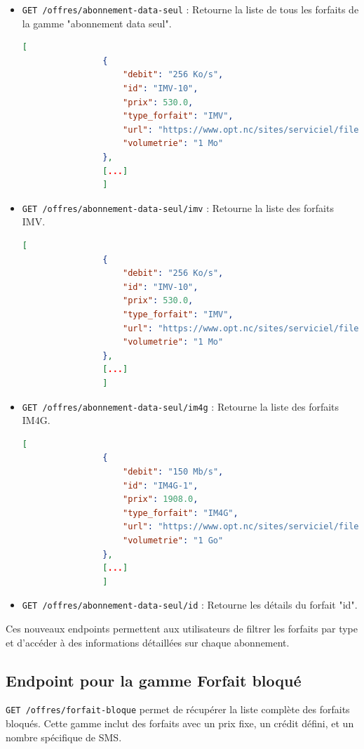 \documentclass[11pt]{article}
\begin{document}
		\begin{itemize}
			\item \texttt{GET /offres/abonnement-data-seul} : Retourne la liste de tous les forfaits de la gamme "abonnement data seul".
			\begin{lstlisting}[language=JSON]
				[
				{
					"debit": "256 Ko/s",
					"id": "IMV-10",
					"prix": 530.0,
					"type_forfait": "IMV",
					"url": "https://www.opt.nc/sites/serviciel/files/media/file/FI_Internet%20Mobile%20au%20Volume.pdf",
					"volumetrie": "1 Mo"
				},
				[...]
				]
			\end{lstlisting}
			
			\item \texttt{GET /offres/abonnement-data-seul/imv} : Retourne la liste des forfaits IMV.
			\begin{lstlisting}[language=JSON]
				[
				{
					"debit": "256 Ko/s",
					"id": "IMV-10",
					"prix": 530.0,
					"type_forfait": "IMV",
					"url": "https://www.opt.nc/sites/serviciel/files/media/file/FI_Internet%20Mobile%20au%20Volume.pdf",
					"volumetrie": "1 Mo"
				},
				[...]
				]
			\end{lstlisting}
			
			\item \texttt{GET /offres/abonnement-data-seul/im4g} : Retourne la liste des forfaits IM4G.
			\begin{lstlisting}[language=JSON]
				[
				{
					"debit": "150 Mb/s",
					"id": "IM4G-1",
					"prix": 1908.0,
					"type_forfait": "IM4G",
					"url": "https://www.opt.nc/sites/serviciel/files/media/file/FI_ForfaitInternetMobile4G%202022_1.pdf",
					"volumetrie": "1 Go"
				},
				[...]
				]
			\end{lstlisting}
			
			\item \texttt{GET /offres/abonnement-data-seul/{id}} : Retourne les détails du forfait "{id}".
		\end{itemize}
		Ces nouveaux endpoints permettent aux utilisateurs de filtrer les forfaits par type et d'accéder à des informations détaillées sur chaque abonnement.
		
		\subsection*{Endpoint pour la gamme Forfait bloqué}
		\texttt{GET /offres/forfait-bloque} permet de récupérer la liste complète des forfaits bloqués. Cette gamme inclut des forfaits avec un prix fixe, un crédit défini, et un nombre spécifique de SMS.
		
\end{document}

